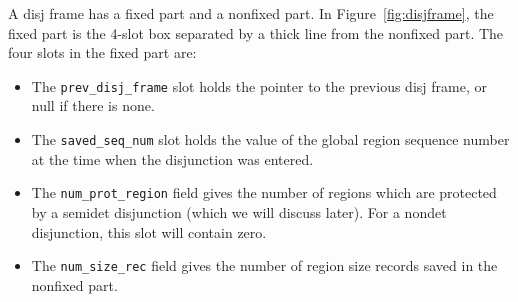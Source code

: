 \documentclass{tlp}
\newcommand{\code}[1]{{\tt#1}}
\begin{document}
A disj frame has a fixed part and a nonfixed part.
In Figure~\ref{fig:disjframe}, the fixed part is the 4-slot box
separated by a thick line from the nonfixed part.
The four slots in the fixed part are:
\begin{itemize}
\item
The \code{prev\_disj\_frame} slot holds the pointer to the previous disj frame,
or null if there is none.
\item
The \code{saved\_seq\_num} slot holds
the value of the global region sequence number
at the time when the disjunction was entered.
\item
The \code{num\_prot\_region} field
gives the number of regions which are protected by a semidet disjunction
(which we will discuss later).
For a nondet disjunction, this slot will contain zero.
\item
The \code{num\_size\_rec} field gives
the number of region size records saved in the nonfixed part.
\end{itemize}
\end{document}
